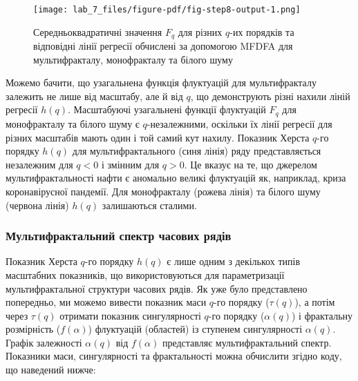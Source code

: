 \documentclass[
  letterpaper,
]{report}
\begin{document}
\begin{figure}[H]

{\centering \texttt{[image: lab\_7\_files/figure-pdf/fig-step8-output-1.png]}

}

\caption{\label{fig-step8}Середньоквадратичні значення \(F_{q}\) для
різних \(q\)-их порядків та відповідні лінії регресії обчислені за
допомогою MFDFA для мультифракталу, монофракталу та білого шуму}

\end{figure}

Можемо бачити, що узагальнена функція флуктуацій для мультифракталу
залежить не лише від масштабу, але й від \(q\), що демонструють різні
нахили ліній регресії \(h(q)\). Масштабуючі узагальнені функції
флуктуацій \(F_{q}\) для монофракталу та білого шуму є
\(q\)-незалежними, оскільки їх лінії регресії для різних масштабів мають
один і той самий кут нахилу. Показник Херста \(q\)-го порядку \(h(q)\)
для мультифрактального (синя лінія) ряду представляється незалежним для
\(q<0\) і змінним для \(q>0\). Це вказує на те, що джерелом
мультифрактальності нафти є аномально великі флуктуацій як, наприклад,
криза коронавірусної пандемії. Для монофракталу (рожева лінія) та білого
шуму (червона лінія) \(h(q)\) залишаються сталими.

\hypertarget{ux43cux443ux43bux44cux442ux438ux444ux440ux430ux43aux442ux430ux43bux44cux43dux438ux439-ux441ux43fux435ux43aux442ux440-ux447ux430ux441ux43eux432ux438ux445-ux440ux44fux434ux456ux432}{%
\subsubsection{Мультифрактальний спектр часових
рядів}\label{ux43cux443ux43bux44cux442ux438ux444ux440ux430ux43aux442ux430ux43bux44cux43dux438ux439-ux441ux43fux435ux43aux442ux440-ux447ux430ux441ux43eux432ux438ux445-ux440ux44fux434ux456ux432}}

Показник Херста \(q\)-го порядку \(h(q)\) є лише одним з декількох типів
масштабних показників, що використовуються для параметризації
мультифрактальної структури часових рядів. Як уже було представлено
попередньо, ми можемо вивести показник маси \(q\)-го порядку
(\(\tau(q)\)), а потім через \(\tau(q)\) отримати показник сингулярності
\(q\)-го порядку (\(\alpha(q)\)) і фрактальну розмірність
(\(f(\alpha)\)) флуктуацій (областей) із ступенем сингулярності
\(\alpha(q)\). Графік залежності \(\alpha(q)\) від \(f(\alpha)\)
представляє мультифрактальний спектр. Показники маси, сингулярності та
фрактальності можна обчислити згідно коду, що наведений нижче:
\end{document}
